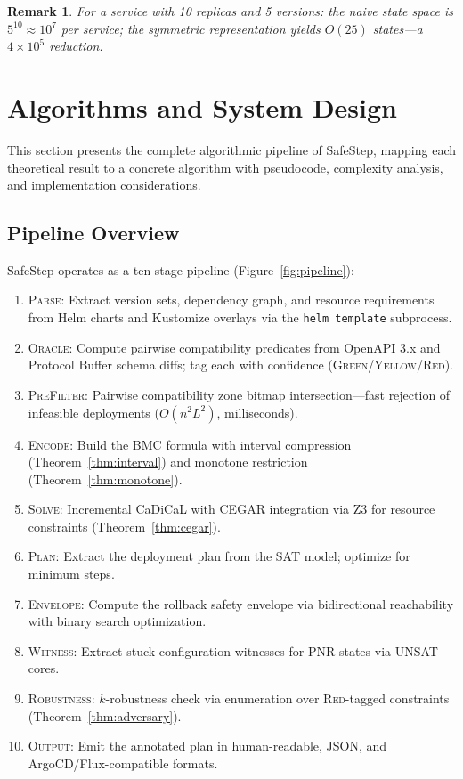 \documentclass[10pt,twocolumn]{article}
\newtheorem{remark}[theorem]{Remark}
\begin{document}
\begin{remark}
For a service with 10 replicas and 5 versions: the naive state space is $5^{10} \approx 10^7$ per service; the symmetric representation yields $O(25)$ states---a $4 \times 10^5$ reduction.
\end{remark}

\section{Algorithms and System Design}
\label{sec:algorithms}

This section presents the complete algorithmic pipeline of SafeStep, mapping each theoretical result to a concrete algorithm with pseudocode, complexity analysis, and implementation considerations.

\subsection{Pipeline Overview}
\label{sec:pipeline}

SafeStep operates as a ten-stage pipeline (Figure~\ref{fig:pipeline}):

\begin{enumerate}
\item \textsc{Parse}: Extract version sets, dependency graph, and resource requirements from Helm charts and Kustomize overlays via the \texttt{helm template} subprocess.
\item \textsc{Oracle}: Compute pairwise compatibility predicates from OpenAPI 3.x and Protocol Buffer schema diffs; tag each with confidence (\textsc{Green}/\textsc{Yellow}/\textsc{Red}).
\item \textsc{PreFilter}: Pairwise compatibility zone bitmap intersection---fast rejection of infeasible deployments ($O(n^2 L^2)$, milliseconds).
\item \textsc{Encode}: Build the BMC formula with interval compression (Theorem~\ref{thm:interval}) and monotone restriction (Theorem~\ref{thm:monotone}).
\item \textsc{Solve}: Incremental CaDiCaL with CEGAR integration via Z3 for resource constraints (Theorem~\ref{thm:cegar}).
\item \textsc{Plan}: Extract the deployment plan from the SAT model; optimize for minimum steps.
\item \textsc{Envelope}: Compute the rollback safety envelope via bidirectional reachability with binary search optimization.
\item \textsc{Witness}: Extract stuck-configuration witnesses for PNR states via UNSAT cores.
\item \textsc{Robustness}: $k$-robustness check via enumeration over \textsc{Red}-tagged constraints (Theorem~\ref{thm:adversary}).
\item \textsc{Output}: Emit the annotated plan in human-readable, JSON, and ArgoCD/Flux-compatible formats.
\end{enumerate}
\end{document}
